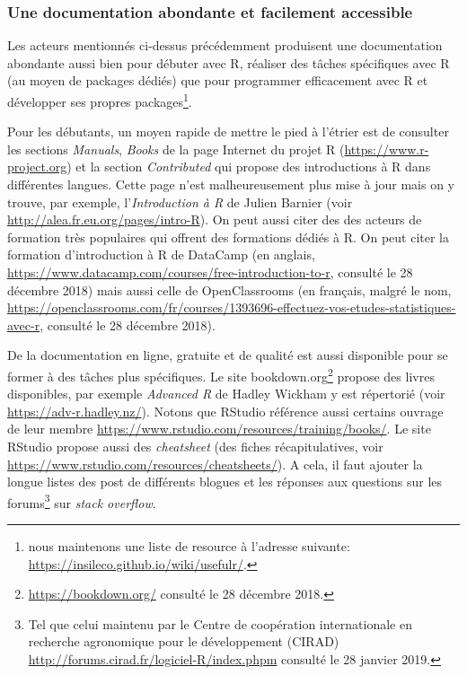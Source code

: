\documentclass[]{article}
\begin{document}
\hypertarget{une-documentation-abondante-et-facilement-accessible}{%
\subsubsection{Une documentation abondante et facilement accessible}\label{une-documentation-abondante-et-facilement-accessible}}

Les acteurs mentionnés ci-dessus précédemment produisent une documentation
abondante aussi bien pour débuter avec R, réaliser des tâches spécifiques avec R (au moyen de packages dédiés) que pour programmer efficacement avec R et développer ses propres packages\footnote{nous maintenons une liste de resource à l'adresse suivante: \url{https://insileco.github.io/wiki/usefulr/}.}.

Pour les débutants, un moyen rapide de mettre le pied à l'étrier est de consulter les sections \emph{Manuals}, \emph{Books} de la page Internet du projet R (\url{https://www.r-project.org}) et la section \emph{Contributed} qui propose des introductions à R dans différentes langues. Cette page n'est malheureusement plus mise à jour mais on y trouve, par exemple, l'\emph{Introduction à R} de Julien Barnier (voir \url{http://alea.fr.eu.org/pages/intro-R}). On peut aussi citer des des acteurs de formation très populaires qui offrent des formations dédiés à R. On peut citer la formation d'introduction à R de DataCamp (en anglais, \url{https://www.datacamp.com/courses/free-introduction-to-r}, consulté le 28 décembre 2018) mais aussi celle de OpenClassrooms (en français, malgré le nom,
\url{https://openclassrooms.com/fr/courses/1393696-effectuez-vos-etudes-statistiques-avec-r}, consulté le 28 décembre 2018).

De la documentation en ligne, gratuite et de qualité est aussi disponible pour se former à des tâches plus spécifiques. Le site bookdown.org\footnote{\url{https://bookdown.org/} consulté le 28 décembre 2018.} propose des livres disponibles, par exemple \emph{Advanced R} de Hadley Wickham y est répertorié (voir \url{https://adv-r.hadley.nz/}). Notons que RStudio référence aussi certains ouvrage de leur membre \url{https://www.rstudio.com/resources/training/books/}. Le site RStudio propose aussi des \emph{cheatsheet} (des fiches récapitulatives, voir \url{https://www.rstudio.com/resources/cheatsheets/}). A cela, il faut ajouter la longue listes des post de différents blogues et les réponses aux questions sur les forums\footnote{Tel que celui maintenu par le Centre de coopération internationale en recherche agronomique pour le développement (CIRAD) \url{http://forums.cirad.fr/logiciel-R/index.phpm}
  consulté le 28 janvier 2019.}
sur \emph{stack overflow}.
\end{document}
